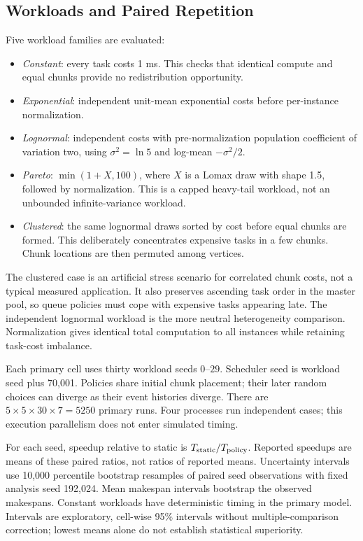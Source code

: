 \documentclass[10pt,journal,twocolumn]{IEEEtran}
\begin{document}
\subsection{Workloads and Paired Repetition}
Five workload families are evaluated:
\begin{itemize}
\item \emph{Constant}: every task costs 1 ms. This checks that identical compute and equal chunks provide no redistribution opportunity.
\item \emph{Exponential}: independent unit-mean exponential costs before per-instance normalization.
\item \emph{Lognormal}: independent costs with pre-normalization population coefficient of variation two, using $\sigma^2=\ln 5$ and log-mean $-\sigma^2/2$.
\item \emph{Pareto}: $\min(1+X,100)$, where $X$ is a Lomax draw with shape 1.5, followed by normalization. This is a capped heavy-tail workload, not an unbounded infinite-variance workload.
\item \emph{Clustered}: the same lognormal draws sorted by cost before equal chunks are formed. This deliberately concentrates expensive tasks in a few chunks. Chunk locations are then permuted among vertices.
\end{itemize}

The clustered case is an artificial stress scenario for correlated chunk costs, not a typical measured application. It also preserves ascending task order in the master pool, so queue policies must cope with expensive tasks appearing late. The independent lognormal workload is the more neutral heterogeneity comparison. Normalization gives identical total computation to all instances while retaining task-cost imbalance.

Each primary cell uses thirty workload seeds $0$--$29$. Scheduler seed is workload seed plus 70,001. Policies share initial chunk placement; their later random choices can diverge as their event histories diverge. There are $5\times5\times30\times7=5250$ primary runs. Four processes run independent cases; this execution parallelism does not enter simulated timing.

For each seed, speedup relative to static is $T_{\rm static}/T_{\rm policy}$. Reported speedups are means of these paired ratios, not ratios of reported means. Uncertainty intervals use 10,000 percentile bootstrap resamples of paired seed observations with fixed analysis seed 192,024. Mean makespan intervals bootstrap the observed makespans. Constant workloads have deterministic timing in the primary model. Intervals are exploratory, cell-wise 95\% intervals without multiple-comparison correction; lowest means alone do not establish statistical superiority.
\end{document}
